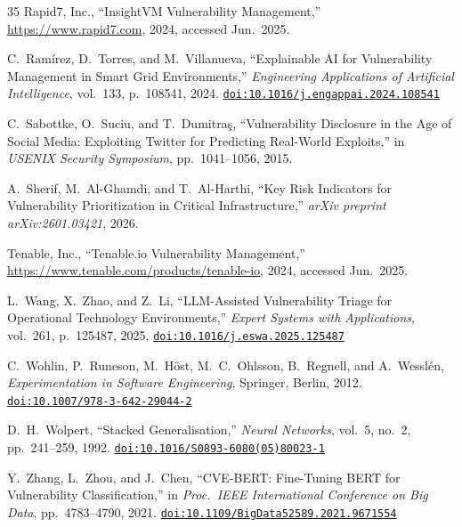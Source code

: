 \documentclass[review,12pt]{elsarticle}
\providecommand{\doi}[1]{\href{https://doi.org/#1}{\texttt{doi:#1}}}
\begin{document}
\begin{thebibliography}{35}
Rapid7, Inc.,
``InsightVM Vulnerability Management,''
\url{https://www.rapid7.com},
2024, accessed Jun.\ 2025.

C.~Ram\'{i}rez, D.~Torres, and M.~Villanueva,
``Explainable AI for Vulnerability Management in Smart Grid Environments,''
\emph{Engineering Applications of Artificial Intelligence},
vol.~133, p.~108541, 2024.
\doi{10.1016/j.engappai.2024.108541}

C.~Sabottke, O.~Suciu, and T.~Dumitra{\c{s}},
``Vulnerability Disclosure in the Age of Social Media: Exploiting Twitter for Predicting Real-World Exploits,''
in \emph{USENIX Security Symposium},
pp.~1041--1056, 2015.

A.~Sherif, M.~Al-Ghamdi, and T.~Al-Harthi,
``Key Risk Indicators for Vulnerability Prioritization in Critical Infrastructure,''
\emph{arXiv preprint arXiv:2601.03421},
2026.

Tenable, Inc.,
``Tenable.io Vulnerability Management,''
\url{https://www.tenable.com/products/tenable-io},
2024, accessed Jun.\ 2025.

L.~Wang, X.~Zhao, and Z.~Li,
``LLM-Assisted Vulnerability Triage for Operational Technology Environments,''
\emph{Expert Systems with Applications},
vol.~261, p.~125487, 2025.
\doi{10.1016/j.eswa.2025.125487}

C.~Wohlin, P.~Runeson, M.~H\"{o}st, M.~C.~Ohlsson, B.~Regnell, and A.~Wessl\'{e}n,
\emph{Experimentation in Software Engineering},
Springer, Berlin, 2012.
\doi{10.1007/978-3-642-29044-2}

D.~H.~Wolpert,
``Stacked Generalisation,''
\emph{Neural Networks}, vol.~5, no.~2, pp.~241--259, 1992.
\doi{10.1016/S0893-6080(05)80023-1}

Y.~Zhang, L.~Zhou, and J.~Chen,
``CVE-BERT: Fine-Tuning BERT for Vulnerability Classification,''
in \emph{Proc.\ IEEE International Conference on Big Data},
pp.~4783--4790, 2021.
\doi{10.1109/BigData52589.2021.9671554}

\end{thebibliography}
\end{document}
